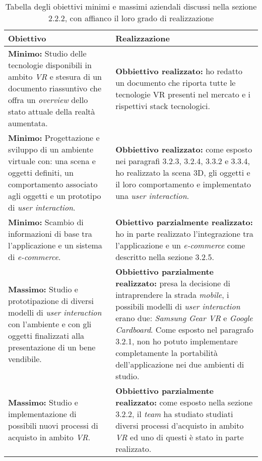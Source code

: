 \begin{table}
	\centering
	\label{tabella-obiettivi}
	\begin{tabular}{| p{6cm} | p{6cm} |}
		\hline
		\textbf{Obiettivo} & \textbf{Realizzazione} \\ \hline
		 \textbf{Minimo:} Studio delle tecnologie disponibili in ambito \textit{VR}\ped{\hyperlink{vr}{G}} e stesura di un documento riassuntivo che offra un \textit{overview} dello stato attuale della realtà aumentata. &  \textbf{Obbiettivo realizzato:} ho redatto un documento che riporta tutte le tecnologie VR presenti nel mercato e i rispettivi stack tecnologici.\\ \hline
		 \textbf{Minimo:} Progettazione e sviluppo di un ambiente virtuale con: una scena e oggetti definiti, un comportamento associato agli oggetti e un prototipo di \textit{user interaction}. & \textbf{Obbiettivo realizzato:} come esposto nei paragrafi 3.2.3, 3.2.4, 3.3.2 e 3.3.4, ho realizzato la scena 3D, gli oggetti e il loro comportamento e implementato una \textit{user interaction}. \\ \hline
		 \textbf{Minimo:} Scambio di informazioni di base tra l'applicazione e un sistema di \textit{e-commerce}. & \textbf{Obiettivo parzialmente realizzato:} ho in parte realizzato l'integrazione tra l'applicazione e un \textit{e-commerce} come descritto nella sezione 3.2.5.\\ \hline
		 \textbf{Massimo:} Studio e prototipazione di diversi modelli di \textit{user interaction} con l'ambiente e con gli oggetti finalizzati alla presentazione di un bene vendibile. & \textbf{Obbiettivo parzialmente realizzato:} presa la decisione di intraprendere la strada \textit{mobile}, i possibili modelli di \textit{user interaction} erano due: \textit{Samsung Gear VR} e \textit{Google Cardboard}. Come esposto nel paragrafo 3.2.1, non ho potuto implementare completamente la portabilità dell'applicazione nei due ambienti di studio.\\ \hline
		 \textbf{Massimo:} Studio e implementazione di possibili nuovi processi di acquisto in ambito \textit{VR}\ped{\hyperlink{vr}{G}}. & \textbf{Obbiettivo parzialmente realizzato:} come esposto nella sezione 3.2.2, il \textit{team} ha studiato studiati diversi processi d'acquisto in ambito \textit{VR}\ped{\hyperlink{vr}{G}} ed uno di questi è stato in parte realizzato.\\ \hline
	\end{tabular}
	\caption{Tabella degli obiettivi minimi e massimi aziendali discussi nella sezione 2.2.2, con affianco il loro grado di realizzazione}
\end{table}
\FloatBarrier


